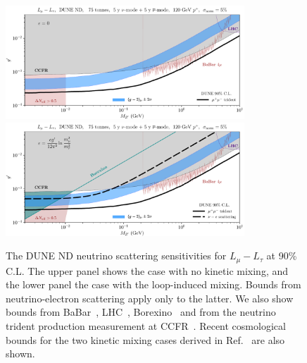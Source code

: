 \begin{figure}[t]
\centering
  \includegraphics[width=0.8\textwidth]{lmultau_nokm.pdf}\\
 \includegraphics[width=0.8\textwidth]{lmultau_km.pdf}
 \caption{The DUNE ND neutrino scattering sensitivities for $L_\mu - L_\tau$ at 90\% C.L. The upper panel shows the case with no kinetic mixing, and the lower panel the case with the loop-induced mixing. Bounds from neutrino-electron scattering apply only to the latter. We also show bounds from BaBar~\cite{TheBABAR:2016rlg}, LHC~\cite{Aad:2014wra}, Borexino~\cite{Kaneta:2016uyt} and from the neutrino trident production measurement at CCFR~\cite{Mishra:1991bv,Altmannshofer2014}. Recent cosmological bounds for the two kinetic mixing cases derived in Ref.~\cite{Escudero:2019gzq} are also shown. \label{fig:Lmu_Ltau}}
\end{figure}
%
%
